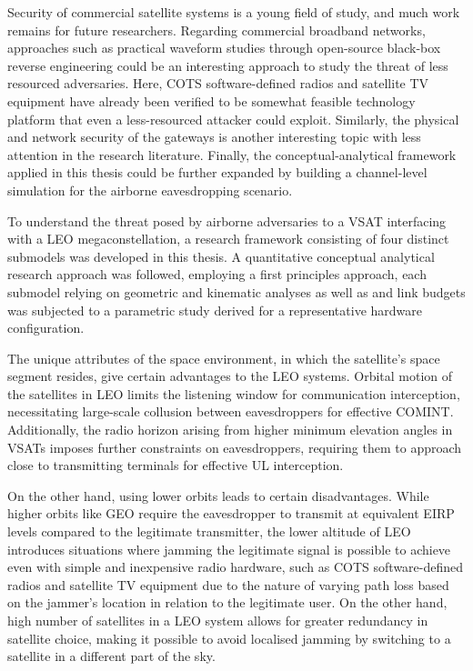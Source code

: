 \documentclass[english, 12pt, a4paper, elec, utf8, a-1b, online]{aaltothesis}
\begin{document}
Security of commercial satellite systems is a young field of study, and much work remains for future researchers.
Regarding commercial broadband networks, approaches such as practical waveform studies through open-source black-box reverse engineering could be an interesting approach to study the threat of less resourced adversaries.
Here, COTS software-defined radios and satellite TV equipment have already been verified to be somewhat feasible technology platform that even a less-resourced attacker could exploit.
Similarly, the physical and network security of the gateways is another interesting topic with less attention in the research literature.
Finally, the conceptual-analytical framework applied in this thesis could be further expanded by building a channel-level simulation for the airborne eavesdropping scenario.

To understand the threat posed by airborne adversaries to a VSAT interfacing with a LEO megaconstellation, a research framework consisting of four distinct submodels was developed in this thesis. A quantitative conceptual analytical research approach was followed, employing a first principles approach, each submodel relying on geometric and kinematic analyses as well as and link budgets was subjected to a parametric study derived for a representative hardware configuration.

The unique attributes of the space environment, in which the satellite's space segment resides, give certain advantages to the LEO systems.
Orbital motion of the satellites in LEO limits the listening window for communication interception, necessitating large-scale collusion between eavesdroppers for effective COMINT.
Additionally, the radio horizon arising from higher minimum elevation angles in VSATs imposes further constraints on eavesdroppers, requiring them to approach close to transmitting terminals for effective UL interception.

On the other hand, using lower orbits leads to certain disadvantages.
While higher orbits like GEO require the eavesdropper to transmit at equivalent EIRP levels compared to the legitimate transmitter, the lower altitude of LEO introduces situations where jamming the legitimate signal is possible to achieve even with simple and inexpensive radio hardware, such as COTS software-defined radios and satellite TV equipment due to the nature of varying path loss based on the jammer's location in relation to the legitimate user. On the other hand, high number of satellites in a LEO system allows for greater redundancy in satellite choice, making it possible to avoid localised jamming by switching to a satellite in a different part of the sky. 
\end{document}
